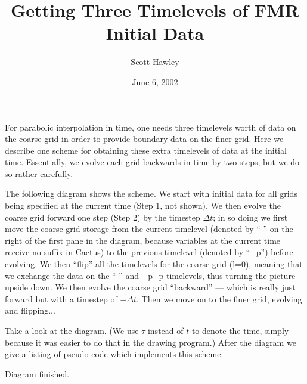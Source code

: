 \documentclass{article}
\begin{document}
\title{Getting Three Timelevels of FMR Initial Data}
\author{Scott Hawley}
\date{June 6, 2002}
\maketitle

For parabolic interpolation in time, one needs three timelevels worth
of data on the coarse grid in order to provide boundary data on the 
finer grid.  Here we describe one scheme for obtaining these extra 
timelevels of data at the initial time.  Essentially, we evolve 
each grid backwards in time by two steps, but we do so rather carefully.

The following diagram shows the scheme.  We start with initial
data for all grids being specified at the current time (Step 1, not 
shown).  We then evolve the coarse grid forward one step (Step 2) by
the timestep $\Delta t$;
in so doing we first move the coarse grid storage from the current
timelevel (denoted by `` '' on the right of the first pane in the
diagram, because variables at the current time receive no suffix 
in Cactus) to the previous timelevel (denoted by ``\_p'') before
evolving.  We then ``flip'' all the timelevels for the coarse grid (l=0), 
meaning
that we exchange the data on the `` '' and \_p\_p timelevels, 
thus turning the picture upside down.
We then evolve the coarse grid ``backward'' --- which is really
just forward but with a timestep of $-\Delta t$.  Then we move on
to the finer grid, evolving and flipping...

Take a look at the diagram.  (We use $\tau$ instead of $t$ to denote
the time, simply because it was easier to do that in the
drawing program.) After the diagram we give a
listing of pseudo-code which implements this scheme.
\begin{center}
   \epsfxsize=5.5in
\end{center}

\begin{center}
   \epsfxsize=5.5in
\end{center}

Diagram finished.

\pagebreak
\end{document}
